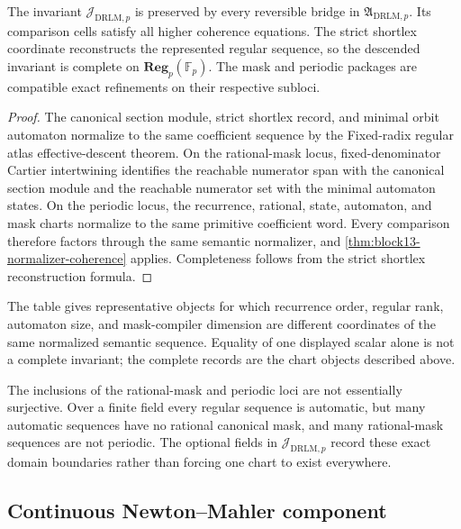 \begin{theorem}
\label{thm:block13-drlm-comparison}
The invariant \(\mathcal J_{\mathrm{DRLM},p}\) is preserved by every reversible bridge in \(\mathfrak A_{\mathrm{DRLM},p}\).  Its comparison cells satisfy all higher coherence equations.  The strict shortlex coordinate reconstructs the represented regular sequence, so the descended invariant is complete on \(\mathbf{Reg}_p(\mathbb F_p)\).  The mask and periodic packages are compatible exact refinements on their respective subloci.
\end{theorem}

\begin{proof}
The canonical section module, strict shortlex record, and minimal orbit automaton normalize to the same coefficient sequence by the Fixed-radix regular atlas effective-descent theorem.  On the rational-mask locus, fixed-denominator Cartier intertwining identifies the reachable numerator span with the canonical section module and the reachable numerator set with the minimal automaton states.  On the periodic locus, the recurrence, rational, state, automaton, and mask charts normalize to the same primitive coefficient word.  Every comparison therefore factors through the same semantic normalizer, and \cref{thm:block13-normalizer-coherence} applies.  Completeness follows from the strict shortlex reconstruction formula.
\end{proof}



The table gives representative objects for which recurrence order, regular rank, automaton size, and mask-compiler dimension are different coordinates of the same normalized semantic sequence.  Equality of one displayed scalar alone is not a complete invariant; the complete records are the chart objects described above.

The inclusions of the rational-mask and periodic loci are not essentially surjective.  Over a finite field every regular sequence is automatic, but many automatic sequences have no rational canonical mask, and many rational-mask sequences are not periodic.  The optional fields in \(\mathcal J_{\mathrm{DRLM},p}\) record these exact domain boundaries rather than forcing one chart to exist everywhere.

\subsection{Continuous Newton--Mahler component}
\label{subsec:block13-loc}

